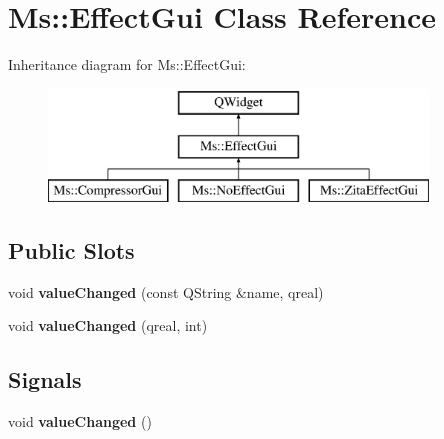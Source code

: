 \hypertarget{class_ms_1_1_effect_gui}{}\section{Ms\+:\+:Effect\+Gui Class Reference}
\label{class_ms_1_1_effect_gui}
Inheritance diagram for Ms\+:\+:Effect\+Gui\+:\begin{figure}[H]
\begin{center}
\leavevmode
\includegraphics[height=3.000000cm]{class_ms_1_1_effect_gui}
\end{center}
\end{figure}
\subsection*{Public Slots}
\begin{DoxyCompactItemize}
\item 
\mbox{\label{class_ms_1_1_effect_gui_a1666a3dde637156fc050adcc3610c177}} 
void {\bfseries value\+Changed} (const Q\+String \&name, qreal)
\item 
\mbox{\label{class_ms_1_1_effect_gui_addd9031b97cfc07e633c78ce735b60aa}} 
void {\bfseries value\+Changed} (qreal, int)
\end{DoxyCompactItemize}
\subsection*{Signals}
\begin{DoxyCompactItemize}
\item 
\mbox{\label{class_ms_1_1_effect_gui_ad707ac2958be2cfe79c8826ab2f688e9}} 
void {\bfseries value\+Changed} ()
\end{DoxyCompactItemize}
